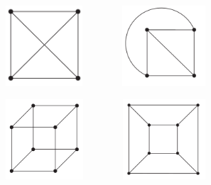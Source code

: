 \documentclass[aspectratio=169]{beamer}
\begin{document}
\begin{frame}[plain]{}


 \begin{center}
  \includegraphics[height=3cm]{./img/lecture8-fig2.png}\pause \ \ \ \ \ \ \ \ 
  \includegraphics[height=3cm]{./img/lecture8-fig3.png}\pause 
 \end{center}
 \medskip
 
 \begin{center}
  \includegraphics[height=3cm]{./img/lecture8-fig4.png}\pause \ \ \ \ \ \ \ \ 
  \includegraphics[height=3cm]{./img/lecture8-fig5.png}
 \end{center}
 
\end{frame}
\end{document}
